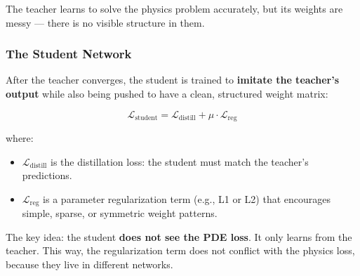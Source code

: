 \documentclass[11pt,a4paper]{article}
\begin{document}
The teacher learns to solve the physics problem accurately, but its weights are messy --- there is no visible structure in them.

\subsubsection*{The Student Network}

After the teacher converges, the student is trained to \textbf{imitate the teacher's output} while also being pushed to have a clean, structured weight matrix:

$$
\mathcal{L}_{\text{student}} = \mathcal{L}_{\text{distill}} + \mu \cdot \mathcal{L}_{\text{reg}}
$$

where:
\begin{itemize}[nosep]
    \item $\mathcal{L}_{\text{distill}}$ is the distillation loss: the student must match the teacher's predictions.
    \item $\mathcal{L}_{\text{reg}}$ is a parameter regularization term (e.g., L1 or L2) that encourages simple, sparse, or symmetric weight patterns.
\end{itemize}

The key idea: the student \textbf{does not see the PDE loss}. It only learns from the teacher. This way, the regularization term does not conflict with the physics loss, because they live in different networks.

\begin{center}
\end{center}
\end{document}
